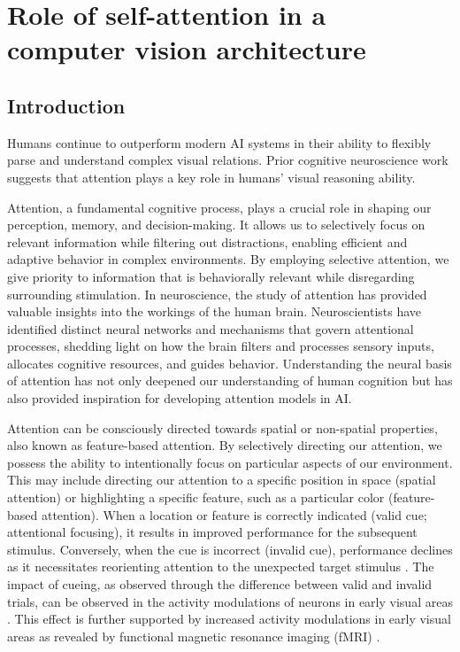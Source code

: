\chapter{Role of self-attention in a computer vision architecture}
\label{chapter1b}

\startcontents[chapters]
\printmyminitoc

\section{Introduction}

Humans continue to outperform modern AI systems in their ability to flexibly parse and understand complex visual relations. Prior cognitive neuroscience work suggests that attention plays a key role in humans' visual reasoning ability. 

Attention, a fundamental cognitive process, plays a crucial role in shaping our perception, memory, and decision-making. It allows us to selectively focus on relevant information while filtering out distractions, enabling efficient and adaptive behavior in complex environments. By employing selective attention, we give priority to information that is behaviorally relevant while disregarding surrounding stimulation. In neuroscience, the study of attention has provided valuable insights into the workings of the human brain. Neuroscientists have identified distinct neural networks and mechanisms that govern attentional processes, shedding light on how the brain filters and processes sensory inputs, allocates cognitive resources, and guides behavior. Understanding the neural basis of attention has not only deepened our understanding of human cognition but has also provided inspiration for developing attention models in AI.

Attention can be consciously directed towards spatial or non-spatial properties, also known as feature-based attention. By selectively directing our attention, we possess the ability to intentionally focus on particular aspects of our environment. This may include directing our attention to a specific position in space (spatial attention) or highlighting a specific feature, such as a particular color (feature-based attention). When a location or feature is correctly indicated (valid cue; attentional focusing), it results in improved performance for the subsequent stimulus. Conversely, when the cue is incorrect (invalid cue), performance declines as it necessitates reorienting attention to the unexpected target stimulus \citep{alanallport1971parallel,posner1980orienting,posner1987selective}. The impact of cueing, as observed through the difference between valid and invalid trials, can be observed in the activity modulations of neurons in early visual areas \citep{moran1985selective,treue1996attentional,roelfsema1998object}. This effect is further supported by increased activity modulations in early visual areas as revealed by functional magnetic resonance imaging (fMRI) \citep{o1999fmri,ungerleider2000mechanisms}.

